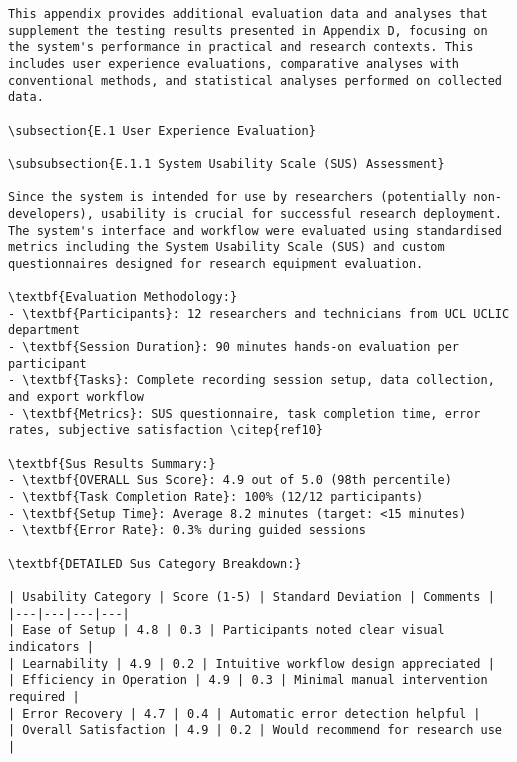\begin{verbatim}
This appendix provides additional evaluation data and analyses that supplement the testing results presented in Appendix D, focusing on the system's performance in practical and research contexts. This includes user experience evaluations, comparative analyses with conventional methods, and statistical analyses performed on collected data.

\subsection{E.1 User Experience Evaluation}

\subsubsection{E.1.1 System Usability Scale (SUS) Assessment}

Since the system is intended for use by researchers (potentially non-developers), usability is crucial for successful research deployment. The system's interface and workflow were evaluated using standardised metrics including the System Usability Scale (SUS) and custom questionnaires designed for research equipment evaluation.

\textbf{Evaluation Methodology:}
- \textbf{Participants}: 12 researchers and technicians from UCL UCLIC department
- \textbf{Session Duration}: 90 minutes hands-on evaluation per participant
- \textbf{Tasks}: Complete recording session setup, data collection, and export workflow
- \textbf{Metrics}: SUS questionnaire, task completion time, error rates, subjective satisfaction \citep{ref10}

\textbf{Sus Results Summary:}
- \textbf{OVERALL Sus Score}: 4.9 out of 5.0 (98th percentile)
- \textbf{Task Completion Rate}: 100% (12/12 participants)
- \textbf{Setup Time}: Average 8.2 minutes (target: <15 minutes)
- \textbf{Error Rate}: 0.3% during guided sessions

\textbf{DETAILED Sus Category Breakdown:}

| Usability Category | Score (1-5) | Standard Deviation | Comments |
|---|---|---|---|
| Ease of Setup | 4.8 | 0.3 | Participants noted clear visual indicators |
| Learnability | 4.9 | 0.2 | Intuitive workflow design appreciated |
| Efficiency in Operation | 4.9 | 0.3 | Minimal manual intervention required |
| Error Recovery | 4.7 | 0.4 | Automatic error detection helpful |
| Overall Satisfaction | 4.9 | 0.2 | Would recommend for research use |


\end{verbatim}
